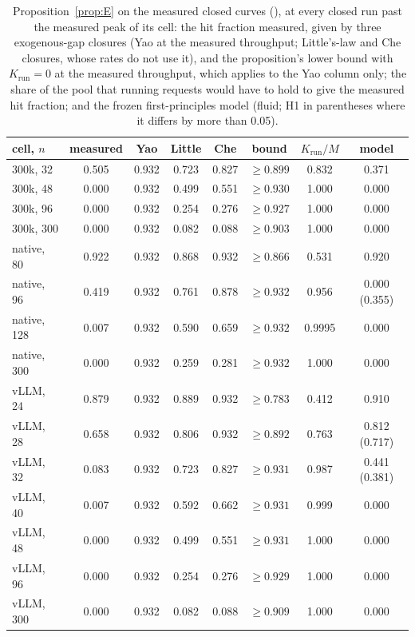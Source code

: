 \begin{table}[htbp]
\centering\footnotesize
\caption{Proposition~\ref{prop:E} on the measured closed curves (), at every closed run past the measured peak of its cell: the hit fraction measured, given by three exogenous-gap closures (Yao at the measured throughput; Little's-law and Che closures, whose rates do not use it), and the proposition's lower bound with $K_{\mathrm{run}}=0$ at the measured throughput, which applies to the Yao column only; the share of the pool that running requests would have to hold to give the measured hit fraction; and the frozen first-principles model (fluid; H1 in parentheses where it differs by more than 0.05).}\label{tab:propE}
\setlength{\tabcolsep}{1.5pt}
\begin{tabular}{@{}l c c c c c c c@{}}
\toprule
cell, $n$ & measured & Yao & Little & Che & bound & $K_{\mathrm{run}}/M$ & model\\
\midrule
300k, 32 & 0.505 & 0.932 & 0.723 & 0.827 & $\ge0.899$ & 0.832 & 0.371\\
300k, 48 & 0.000 & 0.932 & 0.499 & 0.551 & $\ge0.930$ & 1.000 & 0.000\\
300k, 96 & 0.000 & 0.932 & 0.254 & 0.276 & $\ge0.927$ & 1.000 & 0.000\\
300k, 300 & 0.000 & 0.932 & 0.082 & 0.088 & $\ge0.903$ & 1.000 & 0.000\\
native, 80 & 0.922 & 0.932 & 0.868 & 0.932 & $\ge0.866$ & 0.531 & 0.920\\
native, 96 & 0.419 & 0.932 & 0.761 & 0.878 & $\ge0.932$ & 0.956 & 0.000 (0.355)\\
native, 128 & 0.007 & 0.932 & 0.590 & 0.659 & $\ge0.932$ & 0.9995 & 0.000\\
native, 300 & 0.000 & 0.932 & 0.259 & 0.281 & $\ge0.932$ & 1.000 & 0.000\\
vLLM, 24 & 0.879 & 0.932 & 0.889 & 0.932 & $\ge0.783$ & 0.412 & 0.910\\
vLLM, 28 & 0.658 & 0.932 & 0.806 & 0.932 & $\ge0.892$ & 0.763 & 0.812 (0.717)\\
vLLM, 32 & 0.083 & 0.932 & 0.723 & 0.827 & $\ge0.931$ & 0.987 & 0.441 (0.381)\\
vLLM, 40 & 0.007 & 0.932 & 0.592 & 0.662 & $\ge0.931$ & 0.999 & 0.000\\
vLLM, 48 & 0.000 & 0.932 & 0.499 & 0.551 & $\ge0.931$ & 1.000 & 0.000\\
vLLM, 96 & 0.000 & 0.932 & 0.254 & 0.276 & $\ge0.929$ & 1.000 & 0.000\\
vLLM, 300 & 0.000 & 0.932 & 0.082 & 0.088 & $\ge0.909$ & 1.000 & 0.000\\
\bottomrule
\end{tabular}
\end{table}

